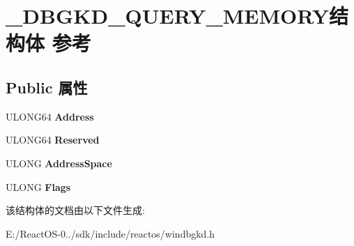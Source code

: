 \hypertarget{struct___d_b_g_k_d___q_u_e_r_y___m_e_m_o_r_y}{}\section{\+\_\+\+D\+B\+G\+K\+D\+\_\+\+Q\+U\+E\+R\+Y\+\_\+\+M\+E\+M\+O\+R\+Y结构体 参考}
\label{struct___d_b_g_k_d___q_u_e_r_y___m_e_m_o_r_y}
\subsection*{Public 属性}
\begin{DoxyCompactItemize}
\item 
\mbox{\label{struct___d_b_g_k_d___q_u_e_r_y___m_e_m_o_r_y_a186177263a54d5bc0a2f5259f4ad29cb}} 
U\+L\+O\+N\+G64 {\bfseries Address}
\item 
\mbox{\label{struct___d_b_g_k_d___q_u_e_r_y___m_e_m_o_r_y_a4302f1b0b10fcf79fa410c680b0fb6ee}} 
U\+L\+O\+N\+G64 {\bfseries Reserved}
\item 
\mbox{\label{struct___d_b_g_k_d___q_u_e_r_y___m_e_m_o_r_y_ab6bc0a1c9501413c07e2c09ffa23850f}} 
U\+L\+O\+NG {\bfseries Address\+Space}
\item 
\mbox{\label{struct___d_b_g_k_d___q_u_e_r_y___m_e_m_o_r_y_a49fbd260a1102808264741fc4cb8d9c1}} 
U\+L\+O\+NG {\bfseries Flags}
\end{DoxyCompactItemize}


该结构体的文档由以下文件生成\+:\begin{DoxyCompactItemize}
\item 
E\+:/\+React\+O\+S-\/0../sdk/include/reactos/windbgkd.\+h\end{DoxyCompactItemize}
